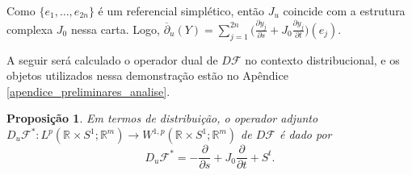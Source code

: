 \documentclass[12pt]{book}
\newtheorem{proposicao}[teorema]{Proposição}
\newcommand{\circulo}{S^{1}}
\newcommand{\diferencialfloer}{D\operadorFloer}
\newcommand{\diferencialfloeradjponto}[1]{D_{#1}\operadorFloer^{*}}
\newcommand{\derivadaparcial}[2]{\frac{\partial #1}{\partial #2}}
\newcommand{\espacoLpcontradominio}[2]{L^{p}(#1;#2)}
\newcommand{\espacosobolevcontradominio}[2]{W^{1,p}(#1;#2)}
\newcommand{\estruturacomplexa}{J_{0}}
\newcommand{\operadorFloer}{\mathcal{F}}
\newcommand{\retacartesianocirculo}{\real{} \times \circulo}
\newcommand{\real}[1]{\mathbb{R}^{#1}}
\begin{document}
	Como $\{e_{1}, \dots,e_{2n} \}$ é um referencial simplético, então $J_{u}$ coincide com a estrutura complexa $\estruturacomplexa$ nessa carta. Logo, $	\overline{\partial}_{u}(Y) =\sum_{j=1}^{2n}\big( \derivadaparcial{y_{j}}{s}+\estruturacomplexa \derivadaparcial{y_{j}}{t}\big)(e_{j})$.
	
	A seguir será calculado o operador dual de $\diferencialfloer$ no contexto distribucional, e os objetos utilizados nessa demonstração estão no Apêndice \ref{apendice_preliminares_analise}.


	\begin{proposicao}\label{proposicao_diferencial_floer_adjunto}
		Em termos de distribuição, o operador adjunto $\diferencialfloeradjponto{u}:\espacoLpcontradominio{\retacartesianocirculo}{\real{m}} \to \espacosobolevcontradominio{\retacartesianocirculo}{\real{m}}$ de $\diferencialfloer$ é dado por
		$$
		\diferencialfloeradjponto{u}=-\derivadaparcial{}{s}+\estruturacomplexa \derivadaparcial{}{t}+S^{t}.
		$$
	\end{proposicao}
\end{document}
